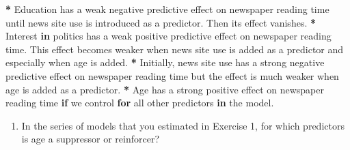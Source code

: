 \documentclass[a4paper]{book}
\newenvironment{Shaded}{\begin{snugshade}}{\end{snugshade}}
\newcommand{\StringTok}[1]{\textcolor[rgb]{0.00,0.00,0.00}{#1}}
\newcommand{\ControlFlowTok}[1]{\textcolor[rgb]{0.00,0.00,0.00}{\textbf{#1}}}
\newcommand{\OperatorTok}[1]{\textcolor[rgb]{0.00,0.00,0.00}{\textbf{#1}}}
\newcommand{\NormalTok}[1]{#1}
\providecommand{\tightlist}{%
  \setlength{\itemsep}{0pt}\setlength{\parskip}{0pt}}
\theoremstyle{definition}
\theoremstyle{definition}
\theoremstyle{definition}
\theoremstyle{remark}
\begin{document}
\begin{Shaded}
\begin{Highlighting}[]
\OperatorTok{*}\StringTok{ }\NormalTok{Education has a weak negative predictive effect on newspaper reading time}
\NormalTok{until news site use is introduced as a predictor. Then its effect vanishes.}
\OperatorTok{*}\StringTok{ }\NormalTok{Interest }\ControlFlowTok{in}\NormalTok{ politics has a weak positive predictive effect on newspaper}
\NormalTok{reading time. This effect becomes weaker when news site use is added as a}
\NormalTok{predictor and especially when age is added.}
\OperatorTok{*}\StringTok{ }\NormalTok{Initially, news site use has a strong negative predictive effect on}
\NormalTok{newspaper reading time but the effect is much weaker when age is added as a}
\NormalTok{predictor.}
\OperatorTok{*}\StringTok{ }\NormalTok{Age has a strong positive effect on newspaper reading time }\ControlFlowTok{if}\NormalTok{ we control }\ControlFlowTok{for}
\NormalTok{all other predictors }\ControlFlowTok{in}\NormalTok{ the model.}
\end{Highlighting}
\end{Shaded}

\begin{enumerate}
\def\labelenumi{\arabic{enumi}.}
\setcounter{enumi}{1}
\tightlist
\item
  In the series of models that you estimated in Exercise 1, for which
  predictors is age a suppressor or reinforcer?
\end{enumerate}
\end{document}
